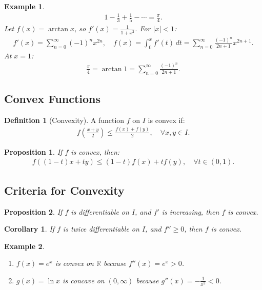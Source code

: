 \documentclass[9pt]{article}
\theoremstyle{definition}
\newtheorem{definition}{Definition}
\theoremstyle{plain}
\newtheorem{proposition}{Proposition}
\newtheorem{example}{Example}
\newtheorem{corollary}{Corollary}
\begin{document}
\begin{example}
\begin{align}
1 - \frac{1}{3} + \frac{1}{5} - \cdots = \frac{\pi}{4}.
\end{align}
Let $ f(x) = \arctan x $, so $ f'(x) = \frac{1}{1+x^2} $. For $ |x| < 1 $:
\begin{align}
f'(x) = \sum_{n=0}^\infty (-1)^n x^{2n}, \quad f(x) = \int_0^x f'(t) \, dt = \sum_{n=0}^\infty \frac{(-1)^n}{2n+1} x^{2n+1}.
\end{align}
At $ x = 1 $:
\begin{align}
\frac{\pi}{4} = \arctan 1 = \sum_{n=0}^\infty \frac{(-1)^n}{2n+1}.
\end{align}
\end{example}

\subsection*{Convex Functions}
\begin{definition}[Convexity]
A function $ f $ on $ I $ is convex if:
\begin{align}
f\left(\frac{x+y}{2}\right) \leq \frac{f(x) + f(y)}{2}, \quad \forall x, y \in I.
\end{align}
\end{definition}

\begin{proposition}
If $ f $ is convex, then:
\begin{align}
f((1-t)x + ty) \leq (1-t)f(x) + tf(y), \quad \forall t \in (0, 1).
\end{align}
\end{proposition}

\subsection*{Criteria for Convexity}
\begin{proposition}
If $ f $ is differentiable on $ I $, and $ f' $ is increasing, then $ f $ is convex.
\end{proposition}

\begin{corollary}
If $ f $ is twice differentiable on $ I $, and $ f'' \geq 0 $, then $ f $ is convex.
\end{corollary}

\begin{example}
\begin{enumerate}
    \item $ f(x) = e^x $ is convex on $ \mathbb{R} $ because $ f''(x) = e^x > 0 $.
    \item $ g(x) = \ln x $ is concave on $ (0, \infty) $ because $ g''(x) = -\frac{1}{x^2} < 0 $.
\end{enumerate}
\end{example}
\end{document}
